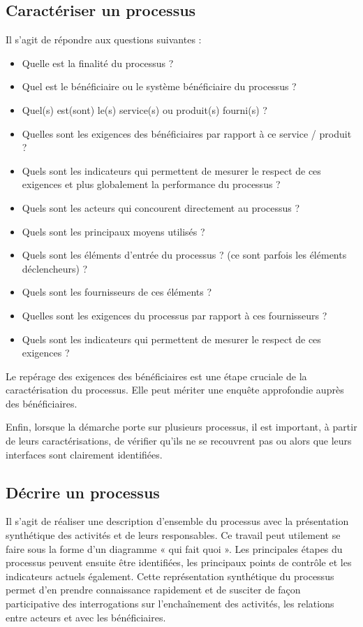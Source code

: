     \subsection{Caractériser un processus } 
	
Il s’agit de répondre aux questions suivantes :
\begin{itemize}[label=\textbullet, font=\LARGE \color{blue}]
	\item Quelle est la finalité du processus ?
	\item Quel est le bénéficiaire ou le système bénéficiaire du processus ?
	\item Quel(s) est(sont) le(s) service(s) ou produit(s) fourni(s) ?
	\item Quelles sont les exigences des bénéficiaires par rapport à ce service / produit ?
	\item Quels sont les indicateurs qui permettent de mesurer le respect de ces exigences et plus globalement la performance du processus ?
	\item Quels sont les acteurs qui concourent directement au processus ?
	\item Quels sont les principaux moyens utilisés ?
	\item Quels sont les éléments d’entrée du processus ? (ce sont parfois les éléments déclencheurs) ?
	\item Quels sont les fournisseurs de ces éléments ?
	\item Quelles sont les exigences du processus par rapport à ces fournisseurs ?
	\item Quels sont les indicateurs qui permettent de mesurer le respect de ces exigences ?
\end{itemize}

Le repérage des exigences des bénéficiaires est une étape cruciale de la caractérisation du processus. Elle peut mériter une enquête approfondie auprès des bénéficiaires.

Enfin, lorsque la démarche porte sur plusieurs processus, il est important, à partir de leurs caractérisations, de vérifier qu’ils ne se recouvrent pas ou alors que leurs interfaces sont clairement identifiées.


	\subsection{Décrire un processus }
	
Il s’agit de réaliser une description d’ensemble du processus avec la présentation synthétique des activités et de leurs responsables. Ce travail peut utilement se faire sous la forme d’un diagramme « qui fait quoi ». Les principales étapes du processus peuvent ensuite être identifiées, les principaux points de contrôle et les indicateurs actuels également. Cette représentation synthétique du processus permet d'en prendre connaissance rapidement et de susciter de façon participative des interrogations sur l'enchaînement des activités, les relations entre acteurs et avec les bénéficiaires. 


